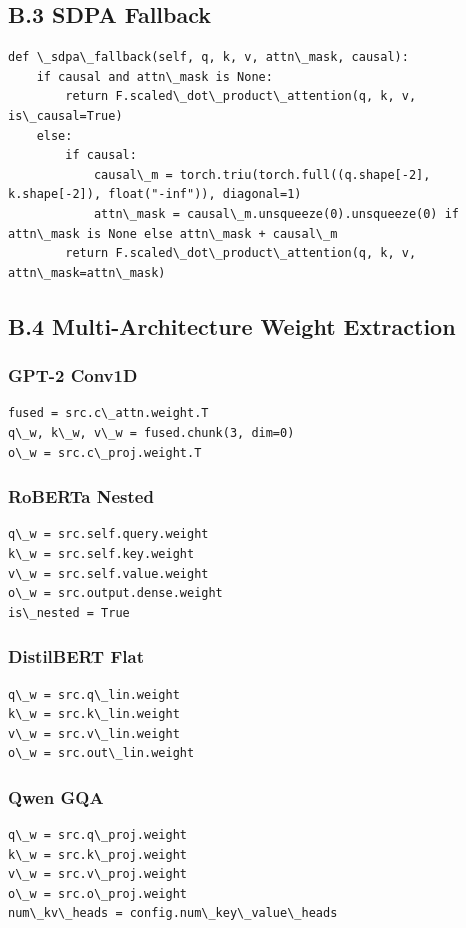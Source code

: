 \subsection{B.3 SDPA Fallback}

\begin{lstlisting}
def \_sdpa\_fallback(self, q, k, v, attn\_mask, causal):
    if causal and attn\_mask is None:
        return F.scaled\_dot\_product\_attention(q, k, v, is\_causal=True)
    else:
        if causal:
            causal\_m = torch.triu(torch.full((q.shape[-2], k.shape[-2]), float("-inf")), diagonal=1)
            attn\_mask = causal\_m.unsqueeze(0).unsqueeze(0) if attn\_mask is None else attn\_mask + causal\_m
        return F.scaled\_dot\_product\_attention(q, k, v, attn\_mask=attn\_mask)
\end{lstlisting}

\subsection{B.4 Multi-Architecture Weight Extraction}

\subsubsection{GPT-2 Conv1D}
\begin{lstlisting}
fused = src.c\_attn.weight.T
q\_w, k\_w, v\_w = fused.chunk(3, dim=0)
o\_w = src.c\_proj.weight.T
\end{lstlisting}

\subsubsection{RoBERTa Nested}
\begin{lstlisting}
q\_w = src.self.query.weight
k\_w = src.self.key.weight
v\_w = src.self.value.weight
o\_w = src.output.dense.weight
is\_nested = True
\end{lstlisting}

\subsubsection{DistilBERT Flat}
\begin{lstlisting}
q\_w = src.q\_lin.weight
k\_w = src.k\_lin.weight
v\_w = src.v\_lin.weight
o\_w = src.out\_lin.weight
\end{lstlisting}

\subsubsection{Qwen GQA}
\begin{lstlisting}
q\_w = src.q\_proj.weight
k\_w = src.k\_proj.weight
v\_w = src.v\_proj.weight
o\_w = src.o\_proj.weight
num\_kv\_heads = config.num\_key\_value\_heads
\end{lstlisting}

